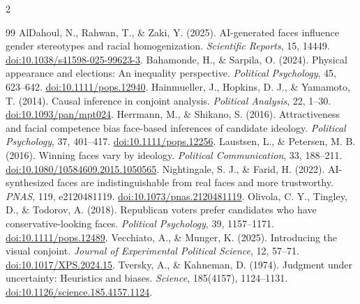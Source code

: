 \documentclass[10pt]{article}
\begin{document}
\begin{multicols}{2}
\footnotesize
\begin{thebibliography}{99}
\setlength{\itemsep}{0pt}\setlength{\parskip}{0pt}
 AlDahoul, N., Rahwan, T., \& Zaki, Y. (2025). AI-generated faces influence gender stereotypes and racial homogenization. \emph{Scientific Reports}, 15, 14449. \href{https://doi.org/10.1038/s41598-025-99623-3}{doi:10.1038/s41598-025-99623-3}.
 Bahamonde, H., \& Sarpila, O. (2024). Physical appearance and elections: An inequality perspective. \emph{Political Psychology}, 45, 623--642. \href{https://doi.org/10.1111/pops.12940}{doi:10.1111/pops.12940}.
 Hainmueller, J., Hopkins, D. J., \& Yamamoto, T. (2014). Causal inference in conjoint analysis. \emph{Political Analysis}, 22, 1--30. \href{https://doi.org/10.1093/pan/mpt024}{doi:10.1093/pan/mpt024}.
 Herrmann, M., \& Shikano, S. (2016). Attractiveness and facial competence bias face-based inferences of candidate ideology. \emph{Political Psychology}, 37, 401--417. \href{https://doi.org/10.1111/pops.12256}{doi:10.1111/pops.12256}.
 Laustsen, L., \& Petersen, M. B. (2016). Winning faces vary by ideology. \emph{Political Communication}, 33, 188--211. \href{https://doi.org/10.1080/10584609.2015.1050565}{doi:10.1080/10584609.2015.1050565}.
 Nightingale, S. J., \& Farid, H. (2022). AI-synthesized faces are indistinguishable from real faces and more trustworthy. \emph{PNAS}, 119, e2120481119. \href{https://doi.org/10.1073/pnas.2120481119}{doi:10.1073/pnas.2120481119}.
 Olivola, C. Y., Tingley, D., \& Todorov, A. (2018). Republican voters prefer candidates who have conservative-looking faces. \emph{Political Psychology}, 39, 1157--1171. \href{https://doi.org/10.1111/pops.12489}{doi:10.1111/pops.12489}.
 Vecchiato, A., \& Munger, K. (2025). Introducing the visual conjoint. \emph{Journal of Experimental Political Science}, 12, 57--71. \href{https://doi.org/10.1017/XPS.2024.15}{doi:10.1017/XPS.2024.15}.
Tversky, A., \& Kahneman, D. (1974).
Judgment under uncertainty: Heuristics and biases.
\emph{Science}, 185(4157), 1124--1131.
\href{https://doi.org/10.1126/science.185.4157.1124}{doi:10.1126/science.185.4157.1124}.
\end{thebibliography}
\end{multicols}
\end{document}
